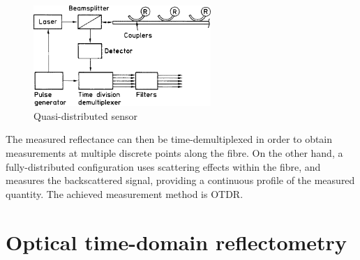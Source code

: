 \documentclass{standalone}
\begin{document}
\begin{figure}[h]
	\centering
	\includegraphics[width=0.6\textwidth]{quasi_distributed.png}
	\caption{Quasi-distributed sensor \cite{Rogers1999}}
	\label{fig:quasi_distributed}
\end{figure}
The measured reflectance can then be time-demultiplexed in order to obtain measurements at multiple discrete points along the fibre. On the other hand, a fully-distributed configuration uses scattering effects within the fibre, and measures the backscattered signal, providing a continuous profile of the measured quantity. The achieved measurement method is OTDR.\\

\section{Optical time-domain reflectometry}
\end{document}
